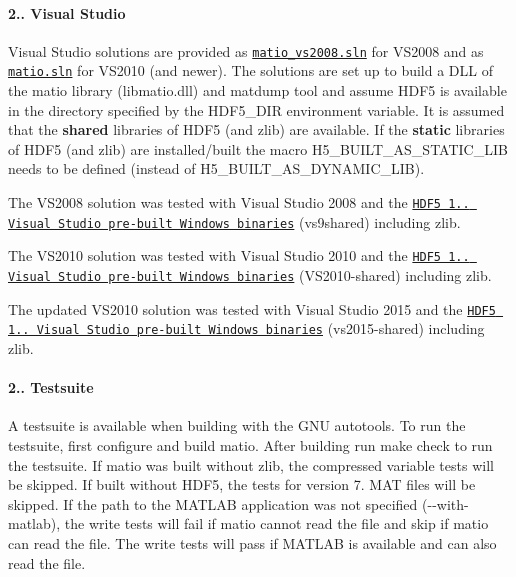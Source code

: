\paragraph*{2.. Visual Studio}

Visual Studio solutions are provided as \href{visual_studio/matio_vs2008.sln}{\tt matio\+\_\+vs2008.\+sln} for V\+S2008 and as \href{visual_studio/matio.sln}{\tt matio.\+sln} for V\+S2010 (and newer). The solutions are set up to build a D\+LL of the matio library (libmatio.\+dll) and matdump tool and assume H\+D\+F5 is available in the directory specified by the H\+D\+F5\+\_\+\+D\+IR environment variable. It is assumed that the {\bfseries shared} libraries of H\+D\+F5 (and zlib) are available. If the {\bfseries static} libraries of H\+D\+F5 (and zlib) are installed/built the macro {\ttfamily H5\+\_\+\+B\+U\+I\+L\+T\+\_\+\+A\+S\+\_\+\+S\+T\+A\+T\+I\+C\+\_\+\+L\+IB} needs to be defined (instead of {\ttfamily H5\+\_\+\+B\+U\+I\+L\+T\+\_\+\+A\+S\+\_\+\+D\+Y\+N\+A\+M\+I\+C\+\_\+\+L\+IB}).


\begin{DoxyItemize}
\item The V\+S2008 solution was tested with Visual Studio 2008 and the \href{https://support.hdfgroup.org/ftp/HDF5/releases/hdf5-1.8/hdf5-1.8.12/bin/windows/}{\tt H\+D\+F5 1.. Visual Studio pre-\/built Windows binaries} (vs9shared) including zlib.
\item The V\+S2010 solution was tested with Visual Studio 2010 and the \href{https://support.hdfgroup.org/ftp/HDF5/releases/hdf5-1.8/hdf5-1.8.13/bin/windows/}{\tt H\+D\+F5 1.. Visual Studio pre-\/built Windows binaries} (V\+S2010-\/shared) including zlib.
\item The updated V\+S2010 solution was tested with Visual Studio 2015 and the \href{https://support.hdfgroup.org/ftp/HDF5/releases/hdf5-1.8/hdf5-1.8.16/bin/windows/extra/}{\tt H\+D\+F5 1.. Visual Studio pre-\/built Windows binaries} (vs2015-\/shared) including zlib.
\end{DoxyItemize}

\paragraph*{2.. Testsuite}

A testsuite is available when building with the G\+NU autotools. To run the testsuite, first configure and build matio. After building run {\ttfamily make check} to run the testsuite. If matio was built without zlib, the compressed variable tests will be skipped. If built without H\+D\+F5, the tests for version 7. M\+AT files will be skipped. If the path to the M\+A\+T\+L\+AB application was not specified ({\ttfamily -\/-\/with-\/matlab}), the write tests will fail if matio cannot read the file and skip if matio can read the file. The write tests will pass if M\+A\+T\+L\+AB is available and can also read the file.

